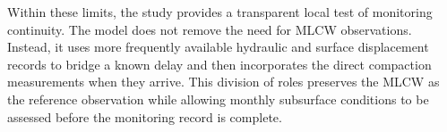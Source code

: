 Within these limits, the study provides a transparent local test of monitoring continuity. The model does not remove the need for MLCW observations. Instead, it uses more frequently available hydraulic and surface displacement records to bridge a known delay and then incorporates the direct compaction measurements when they arrive. This division of roles preserves the MLCW as the reference observation while allowing monthly subsurface conditions to be assessed before the monitoring record is complete.
